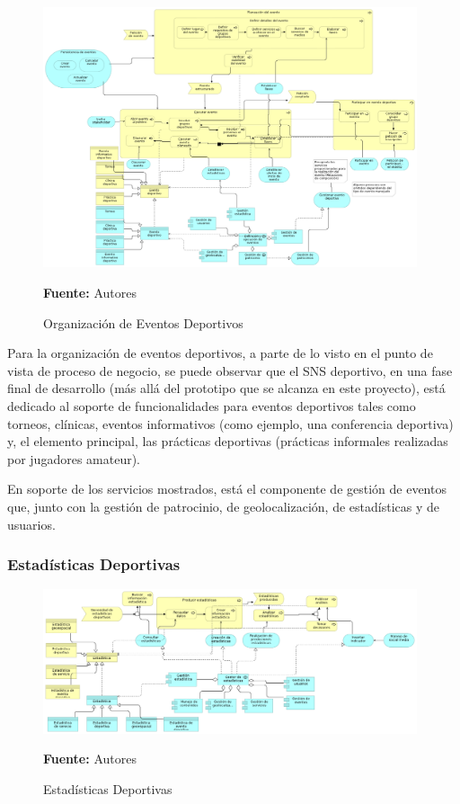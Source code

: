 \begin{figure}[!htb]
  \begin{center}
    \includegraphics[width=11cm]{./imagenes/Archimate/vistas/application_usage/organizacioneventosdeportivos.png}
    \caption{Organización de Eventos Deportivos}
    \label{fig:au_organizacion_eventos_deportivos}
    \textbf{Fuente:}  Autores
  \end{center}
\end{figure}

Para la organización de eventos deportivos, a parte de lo visto en el punto de vista de proceso de negocio, se puede observar que el SNS deportivo, en una fase final de desarrollo (más allá del prototipo que se alcanza en este proyecto), está dedicado al soporte de funcionalidades para eventos deportivos tales como torneos, clínicas, eventos informativos (como ejemplo, una conferencia deportiva) y, el elemento principal, las prácticas deportivas (prácticas informales realizadas por jugadores amateur).

En soporte de los servicios mostrados, está el componente de gestión de eventos que, junto con la gestión de patrocinio, de geolocalización, de estadísticas y de usuarios.

\subsubsection{Estadísticas Deportivas}

\begin{figure}[!htb]
  \begin{center}
    \includegraphics[width=11cm]{./imagenes/Archimate/vistas/application_usage/estadisticasdeportivas.png}
    \caption{Estadísticas Deportivas}
    \label{fig:au_estadisticas_deportivas}
    \textbf{Fuente:}  Autores
  \end{center}
\end{figure}

